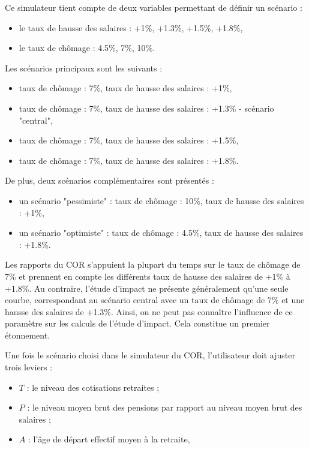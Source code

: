 \documentclass[10pt]{article}
\begin{document}
Ce simulateur tient compte de deux variables permettant de définir un scénario :
\begin{itemize}
\item le taux de hausse des salaires : +1\%, +1.3\%, +1.5\%, +1.8\%, 
\item le taux de chômage : 4.5\%, 7\%, 10\%.
\end{itemize}

Les scénarios principaux sont les suivants :
\begin{itemize}
\item taux de chômage : 7\%, taux de hausse des salaires : +1\%, 
\item taux de chômage : 7\%, taux de hausse des salaires : +1.3\% - scénario "central", 
\item taux de chômage : 7\%, taux de hausse des salaires : +1.5\%, 
\item taux de chômage : 7\%, taux de hausse des salaires : +1.8\%.
\end{itemize}
De plus, deux scénarios complémentaires sont présentés :
\begin{itemize}
\item un scénario "pessimiste" : taux de chômage : 10\%, taux de hausse des salaires : +1\%, 
\item un scénario "optimiste" : taux de chômage : 4.5\%, taux de hausse des salaires : +1.8\%. 
\end{itemize}

Les rapports du COR s'appuient la plupart du temps sur le taux 
de chômage de 7\% et prennent en compte les différents taux de hausse 
des salaires de +1\% à +1.8\%. 
Au contraire, l'étude d'impact ne présente généralement qu'une seule 
courbe, correspondant au scénario central avec un taux de chômage de 7\% et une hausse des 
salaires de +1.3\%. 
Ainsi, on ne peut pas connaître l'influence de ce paramètre sur les calculs 
de l'étude d'impact. 
Cela constitue un premier étonnement. 

Une fois le scénario choisi dans le simulateur du COR, 
l'utilisateur doit ajuster trois leviers : 
\begin{itemize}
\item $T$ : le niveau des cotisations retraites ;
\item $P$ : le niveau moyen brut des pensions par rapport au niveau moyen brut des salaires ;
\item $A$ : l'âge de départ effectif moyen à la retraite, 
\end{itemize}
\end{document}
